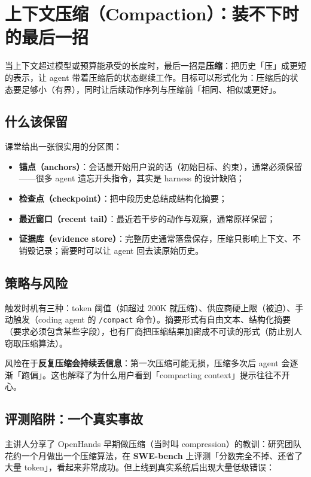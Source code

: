 \documentclass[a4paper]{article}
\begin{document}
\section{上下文压缩（Compaction）：装不下时的最后一招}

当上下文超过模型或预算能承受的长度时，最后一招是\textbf{压缩}：把历史「压」成更短的表示，让 agent 带着压缩后的状态继续工作。目标可以形式化为：压缩后的状态要足够小（有界），同时让后续动作序列与压缩前「相同、相似或更好」。

\subsection{什么该保留}

课堂给出一张很实用的分区图：

\begin{itemize}
\item \textbf{锚点（anchors）}：会话最开始用户说的话（初始目标、约束），通常必须保留——很多 agent 遗忘开头指令，其实是 harness 的设计缺陷；
\item \textbf{检查点（checkpoint）}：把中段历史总结成结构化摘要；
\item \textbf{最近窗口（recent tail）}：最近若干步的动作与观察，通常原样保留；
\item \textbf{证据库（evidence store）}：完整历史通常落盘保存，压缩只影响上下文、不销毁记录；需要时可以让 agent 回去读原始历史。
\end{itemize}

\subsection{策略与风险}

触发时机有三种：token 阈值（如超过 200K 就压缩）、供应商硬上限（被迫）、手动触发（coding agent 的 \texttt{/compact} 命令）。摘要形式有自由文本、结构化摘要（要求必须包含某些字段），也有厂商把压缩结果加密成不可读的形式（防止别人窃取压缩算法）。

风险在于\textbf{反复压缩会持续丢信息}：第一次压缩可能无损，压缩多次后 agent 会逐渐「跑偏」。这也解释了为什么用户看到「compacting context」提示往往不开心。

\subsection{评测陷阱：一个真实事故}

主讲人分享了 OpenHands 早期做压缩（当时叫 compression）的教训：研究团队花约一个月做出一个压缩算法，在 \textbf{SWE-bench} 上评测「分数完全不掉、还省了大量 token」，看起来非常成功。但上线到真实系统后出现大量低级错误：
\end{document}
